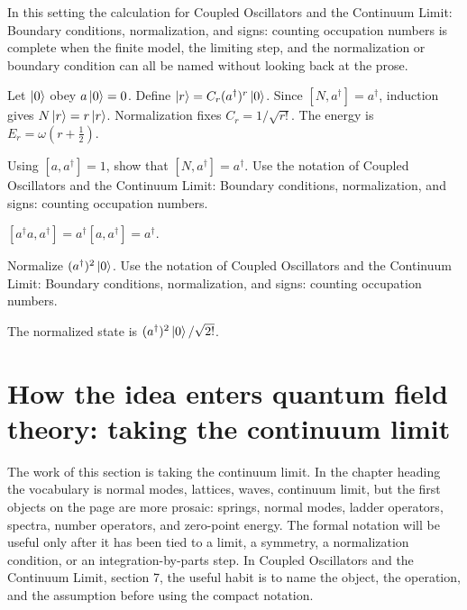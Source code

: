 In this setting the calculation for Coupled Oscillators and the Continuum Limit: Boundary conditions, normalization, and signs: counting occupation numbers is complete when the finite model, the limiting step, and the normalization or boundary condition can all be named without looking back at the prose.




\begin{example}
Let \(\left|0\right\rangle\) obey \(a\left|0\right\rangle=0\).  Define \(\left|r\right\rangle=C_r(a^\dagger)^r\left|0\right\rangle\).  Since \([N,a^\dagger]=a^\dagger\), induction gives \(N\left|r\right\rangle=r\left|r\right\rangle\).  Normalization fixes \(C_r=1/\sqrt{r!}\).  The energy is \(E_r=\omega(r+\frac12)\).
\end{example}



\begin{exercise}
Using \([a,a^\dagger]=1\), show that \([N,a^\dagger]=a^\dagger\).  Use the notation of Coupled Oscillators and the Continuum Limit: Boundary conditions, normalization, and signs: counting occupation numbers.
\begin{answer}
\([a^\dagger a,a^\dagger]=a^\dagger[a,a^\dagger]=a^\dagger\).
\end{answer}
\end{exercise}

\begin{exercise}
Normalize \((a^\dagger)^2\left|0\right\rangle\).  Use the notation of Coupled Oscillators and the Continuum Limit: Boundary conditions, normalization, and signs: counting occupation numbers.
\begin{answer}
The normalized state is \((a^\dagger)^2\left|0\right\rangle/\sqrt{2!}\).
\end{answer}
\end{exercise}



\section{How the idea enters quantum field theory: taking the continuum limit}

The work of this section is taking the continuum limit.  In the chapter heading the vocabulary is normal modes, lattices, waves, continuum limit, but the first objects on the page are more prosaic: springs, normal modes, ladder operators, spectra, number operators, and zero-point energy.  The formal notation will be useful only after it has been tied to a limit, a symmetry, a normalization condition, or an integration-by-parts step.  In Coupled Oscillators and the Continuum Limit, section 7, the useful habit is to name the object, the operation, and the assumption before using the compact notation.

